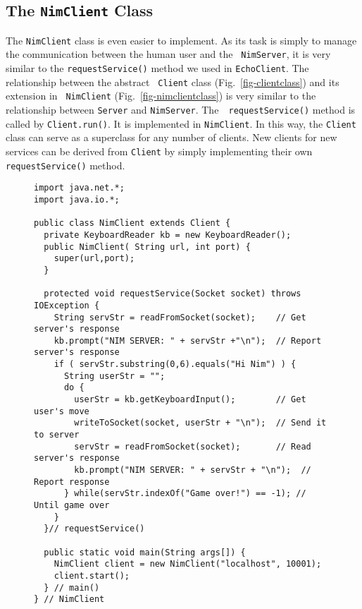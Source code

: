 \subsection{The {\tt NimClient} Class}

The {\tt NimClient} class is even easier to implement. As its task is
simply to manage the communication between the human user and the {\tt
NimServer}, it is very similar to the {\tt requestService()} method we
used in {\tt EchoClient}.  The relationship between the abstract {\tt
Client} class (Fig.~\ref{fig-clientclass}) and its extension in {\tt
NimClient} (Fig.~\ref{fig-nimclientclass}) is very similar to the
relationship between {\tt Server} and {\tt NimServer}.  The~{\tt
request\-Service()} method is called by {\tt Client.run()}.  It is
implemented in {\tt NimClient}. In this way, the {\tt Client} class
can serve as a superclass for any number of clients.
New clients for new services can be derived from {\tt Client} by
simply implementing their own {\tt requestService()} method.  


\begin{figure}[tb]
\jjjprogstart
\begin{jjjlisting}[34pc]
\begin{lstlisting}
import java.net.*;
import java.io.*;

public class NimClient extends Client {
  private KeyboardReader kb = new KeyboardReader();
  public NimClient( String url, int port) {
    super(url,port);
  }

  protected void requestService(Socket socket) throws IOException {
    String servStr = readFromSocket(socket);    // Get server's response
    kb.prompt("NIM SERVER: " + servStr +"\n");  // Report server's response
    if ( servStr.substring(0,6).equals("Hi Nim") ) {
      String userStr = "";
      do {
        userStr = kb.getKeyboardInput();        // Get user's move
        writeToSocket(socket, userStr + "\n");  // Send it to server
        servStr = readFromSocket(socket);       // Read server's response
        kb.prompt("NIM SERVER: " + servStr + "\n");  // Report response
      } while(servStr.indexOf("Game over!") == -1); // Until game over
    }
  }// requestService()

  public static void main(String args[]) {
    NimClient client = new NimClient("localhost", 10001);
    client.start();
  } // main()
} // NimClient
\end{lstlisting}
\end{jjjlisting}
\end{figure}

